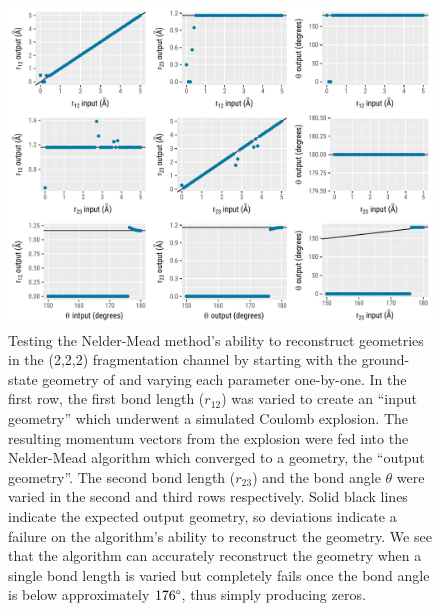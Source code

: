 \begin{figure}
  \centering
  \includegraphics[width=\textwidth]{Plots/CO2SimplexCalibrationPlots}
  \caption[Testing the Nelder-Mead method's ability to reconstruct  (2,2,2) geometries]
  {Testing the Nelder-Mead method's ability to reconstruct  geometries in the (2,2,2) fragmentation channel by starting with the ground-state geometry of  and varying each parameter one-by-one. In the first row, the first  bond length ($r_{12}$) was varied to create an ``input geometry'' which underwent a simulated Coulomb explosion. The resulting momentum vectors from the explosion were fed into the Nelder-Mead algorithm which converged to a geometry, the ``output geometry''. The second  bond length ($r_{23}$) and the bond angle $\theta$ were varied in the second and third rows respectively. Solid black lines indicate the expected output geometry, so deviations indicate a failure on the algorithm's ability to reconstruct the geometry. We see that the algorithm can accurately reconstruct the geometry when a single bond length is varied but completely fails once the bond angle is below approximately $176\degree$, thus simply producing zeros.}
  \label{fig:CO2SimplexCalibrationPlots}
\end{figure}

